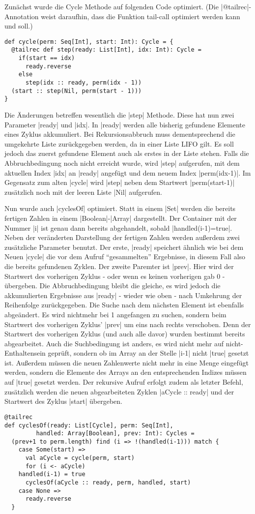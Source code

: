 Zunächst wurde die Cycle Methode auf folgenden Code optimiert. (Die |@tailrec|-Annotation weist daraufhin, dass die Funktion tail-call optimiert werden kann und soll.)
\begin{lstlisting}
def cycle(perm: Seq[Int], start: Int): Cycle = {
  @tailrec def step(ready: List[Int], idx: Int): Cycle =
    if(start == idx)
      ready.reverse
    else
      step(idx :: ready, perm(idx - 1))
  (start :: step(Nil, perm(start - 1)))
}
\end{lstlisting}
Die Änderungen betreffen wesentlich die |step| Methode. Diese hat nun zwei Parameter |ready| und |idx|.
In |ready| werden alle bisherig gefundene Elemente eines Zyklus akkumuliert.
Bei Rekursionsabbruch muss dementsprechend die umgekehrte Liste zurückgegeben werden, da in einer Liste LIFO gilt.
Es soll jedoch das zuerst gefundene Element auch als erstes in der Liste stehen.
Falls die Abbruchbedingung noch nicht erreicht wurde, wird |step| aufgerufen, mit dem aktuellen Index |idx| an |ready| angefügt und dem neuem Index |perm(idx-1)|.
Im Gegensatz zum alten |cycle| wird |step| neben dem Startwert |perm(start-1)| zusätzlich noch mit der leeren Liste |Nil| aufgerufen.

Nun wurde auch |cyclesOf| optimiert. Statt in einem |Set| werden die bereits fertigen Zahlen in einem |Boolean|-|Array| dargestellt.
Der Container mit der Nummer |i| ist genau dann bereits abgehandelt, sobald |handled(i-1)=true|.
Neben der veränderten Darstellung der fertigen Zahlen werden außerdem zwei zusätzliche Parameter benutzt.
Der erste, |ready| speichert ähnlich wie bei dem Neuen |cycle| die vor dem Aufruf ``gesammelten'' Ergebnisse, in diesem Fall also die bereits gefundenen Zyklen.
Der zweite Paremter ist |prev|. Hier wird der Startwert des vorherigen Zyklus - oder wenn es keinen vorherigen gab 0 - übergeben.
Die Abbruchbedingung bleibt die gleiche, es wird jedoch die akkumulierten Ergebnisse aus |ready| - wieder wie oben - nach Umkehrung der Reihenfolge zurückgegeben.
Die Suche nach dem nächsten Element ist ebenfalls abgeändert.
Es wird nichtmehr bei 1 angefangen zu suchen, sondern beim Startwert des vorherigen Zyklus' |prev| um eins nach rechts verschoben.
Denn der Startwert des vorherigen Zyklus (und auch alle davor) wurden bestimmt bereits abgearbeitet.
Auch die Suchbedingung ist anders, es wird nicht mehr auf nicht-Enthaltensein geprüft, sondern ob im Array an der Stelle |i-1| nicht |true| gesetzt ist.
Außerdem müssen die neuen Zahlenwerte nicht mehr in eine Menge eingefügt werden, sondern die Elemente des Arrays an den entsprechenden Indizes müssen auf |true| gesetzt werden.
Der rekursive Aufruf erfolgt zudem als letzter Befehl,
zusätzlich werden die neuen abgearbeiteten Zyklen |aCycle :: ready| und der Startwert des Zyklus |start| übergeben.
\begin{lstlisting}
@tailrec
def cyclesOf(ready: List[Cycle], perm: Seq[Int],
	     handled: Array[Boolean], prev: Int): Cycles =
  (prev+1 to perm.length) find (i => !(handled(i-1))) match {
    case Some(start) =>
      val aCycle = cycle(perm, start)
      for (i <- aCycle)
	handled(i-1) = true
      cyclesOf(aCycle :: ready, perm, handled, start)
    case None =>
      ready.reverse
  }
\end{lstlisting}

